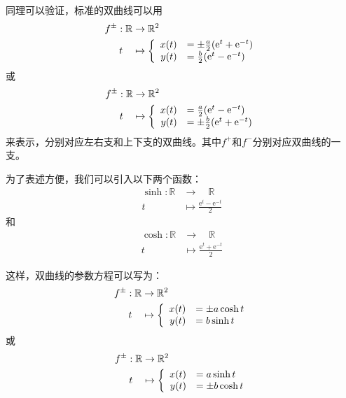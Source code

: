 \documentclass[12pt,UTF8]{ctexbook}
\theoremstyle{definition}
\theoremstyle{plain}
\begin{document}
同理可以验证，标准的双曲线可以用
\begin{align*}
    f^{\pm}: \mathbb{R} &\rightarrow \mathbb{R}^2 \\
    t\quad &\mapsto\left\{
        \begin{array}[]{rl}
            x(t) &= \pm\frac{a}{2}(\mathrm{e}^t + \mathrm{e}^{-t}) \\
            y(t) &= \frac{b}{2}(\mathrm{e}^t - \mathrm{e}^{-t}) \\
        \end{array}
    \right.
\end{align*}
或
\begin{align*}
    f^{\pm}: \mathbb{R} &\rightarrow \mathbb{R}^2 \\
    t\quad &\mapsto\left\{
        \begin{array}[]{rl}
            x(t) &= \frac{a}{2}(\mathrm{e}^t - \mathrm{e}^{-t}) \\
            y(t) &= \pm\frac{b}{2}(\mathrm{e}^t + \mathrm{e}^{-t}) \\
        \end{array}
    \right.
\end{align*}
来表示，分别对应左右支和上下支的双曲线。其中$f^+$和$f^-$分别对应双曲线的一支。

为了表述方便，我们可以引入以下两个函数：
\begin{align*}
    \sinh: \mathbb{R} &\rightarrow \quad \mathbb{R} \\
    t\; &\mapsto \frac{\mathrm{e}^t - \mathrm{e}^{-t}}{2} 
\end{align*}
和
\begin{align*}
    \cosh: \mathbb{R} &\rightarrow \quad \mathbb{R} \\
    t\; &\mapsto \frac{\mathrm{e}^t + \mathrm{e}^{-t}}{2} 
\end{align*}

这样，双曲线的参数方程可以写为：
\begin{align*}
    f^{\pm}: \mathbb{R} &\rightarrow \mathbb{R}^2 \\
    t\quad &\mapsto\left\{
        \begin{array}[]{rl}
            x(t) &= \pm a\cosh{t} \\
            y(t) &= b\sinh{t} \\
        \end{array}
    \right.
\end{align*}
或
\begin{align*}
    f^{\pm}: \mathbb{R} &\rightarrow \mathbb{R}^2 \\
    t\quad &\mapsto\left\{
        \begin{array}[]{rl}
            x(t) &= a\sinh{t} \\
            y(t) &= \pm b\cosh{t} \\
        \end{array}
    \right.
\end{align*}
\end{document}
